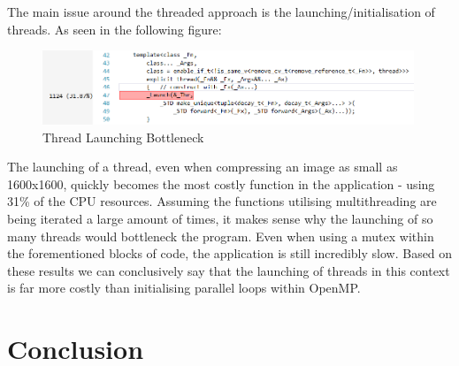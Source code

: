 \documentclass[12pt, a4paper]{article}
\begin{document}
The main issue around the threaded approach is the launching/initialisation of threads. As seen in the following figure:

\begin{figure}[H]
	\centering
		\includegraphics[width=0.99\textwidth]{"ThreadLaunch"}
		\caption{Thread Launching Bottleneck}
\end{figure}

The launching of a thread, even when compressing an image as small as 1600x1600, quickly becomes the most costly function in the application - using 31\% of the CPU resources. Assuming the functions utilising multithreading are being iterated a large amount of times, it makes sense why the launching of so many threads would bottleneck the program. Even when using a mutex within the forementioned blocks of code, the application is still incredibly slow. Based on these results we can conclusively say that the launching of threads in this context is far more costly than initialising parallel loops within OpenMP. 

\section{Conclusion}

\newpage


{}
\nocite{*}
\end{document}
